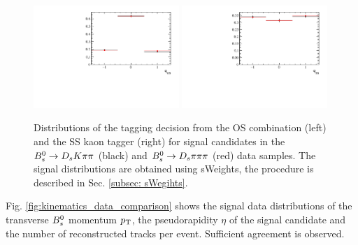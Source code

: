\begin{figure}[h]
\includegraphics[height=7.cm,width=0.49\textwidth]{figs/Tagging/qOS.pdf}
\includegraphics[height=7.cm,width=0.49\textwidth]{figs/Tagging/q_SS.pdf}
\caption{Distributions of the tagging decision from the OS combination (left) and the SS kaon tagger (right) for signal candidates in the ${{B}^0_{s}}\rightarrow{\ensuremath{{D}_{s}}}{\ensuremath{K}}{\ensuremath{\pi}}{\ensuremath{\pi}}$ (black) and ${{B}^0_{s}}\rightarrow{\ensuremath{{D}_{s}}}{\ensuremath{\pi}}{\ensuremath{\pi}}{\ensuremath{\pi}}$ (red) data samples. 
The signal distributions are obtained using sWeights, the procedure is described in Sec. \ref{subsec: sWegihts}.}
\label{fig:tagDec_data_comparison}
\end{figure}

Fig. \ref{fig:kinematics_data_comparison} shows the signal data distributions of the transverse ${{B}^0_{s}}$ momentum $\mbox{$p_{\mathrm{ T}}$}$, the pseudorapidity $\eta$ of the signal candidate and the number of reconstructed tracks per event.
Sufficient agreement is observed.


